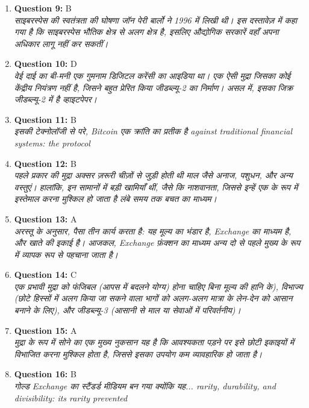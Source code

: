 \documentclass[12pt,a4paper]{article}
\begin{document}
\begin{enumerate}
\item \textbf{Question 9:} B
\\ \textit{साइबरस्पेस की स्वतंत्रता की घोषणा जॉन पेरी बार्लो ने 1996 में लिखी थी। इस दस्तावेज़ में कहा गया है कि साइबरस्पेस भौतिक क्षेत्र से अलग क्षेत्र है, इसलिए औद्योगिक सरकारें वहाँ अपना अधिकार लागू नहीं कर सकतीं।}

\item \textbf{Question 10:} D
\\ \textit{वेई दाई का बी-मनी एक गुमनाम डिजिटल करेंसी का आइडिया था। एक ऐसी मुद्रा जिसका कोई केंद्रीय नियंत्रण नहीं है, जिसने बहुत प्रेरित किया जीडब्ल्यू-2 का निर्माण। असल में, इसका जिक्र जीडब्ल्यू-2 में है व्हाइटपेपर।}

\item \textbf{Question 11:} B
\\ \textit{इसकी टेक्नोलॉजी से परे, Bitcoin एक क्रांति का प्रतीक है against traditional financial systems: the protocol}

\item \textbf{Question 12:} B
\\ \textit{पहले प्रकार की मुद्रा अक्सर ज़रूरी चीज़ों से जुड़ी होती थी माल जैसे अनाज, पशुधन, और अन्य वस्तुएं। हालांकि, इन सामानों में बड़ी खामियाँ थीं, जैसे कि नाशवानता, जिससे इन्हें एक के रूप में इस्तेमाल करना मुश्किल हो जाता है लंबे समय तक बचत का माध्यम।}

\item \textbf{Question 13:} A
\\ \textit{अरस्तू के अनुसार, पैसा तीन कार्य करता है: यह मूल्य का भंडार है, Exchange का माध्यम है, और खाते की इकाई है। आजकल, Exchange फ़ंक्शन का माध्यम अन्य दो से पहले मुख्य के रूप में व्यापक रूप से पहचाना जाता है।}

\item \textbf{Question 14:} C
\\ \textit{एक प्रभावी मुद्रा को फंजिबल (आपस में बदलने योग्य) होना चाहिए बिना मूल्य की हानि के), विभाज्य (छोटे हिस्सों में अलग किया जा सकने वाला भागों को अलग-अलग मात्रा के लेन-देन को आसान बनाने के लिए), और जीडब्ल्यू-3 (आसानी से माल या सेवाओं में परिवर्तनीय)।}

\item \textbf{Question 15:} A
\\ \textit{मुद्रा के रूप में सोने का एक मुख्य नुकसान यह है कि आवश्यकता पड़ने पर इसे छोटी इकाइयों में विभाजित करना मुश्किल होता है, जिससे इसका उपयोग कम व्यावहारिक हो जाता है।}

\item \textbf{Question 16:} B
\\ \textit{गोल्ड Exchange का स्टैंडर्ड मीडियम बन गया क्योंकि यह... rarity, durability, and divisibility: its rarity prevented}


\end{enumerate}
\end{document}
